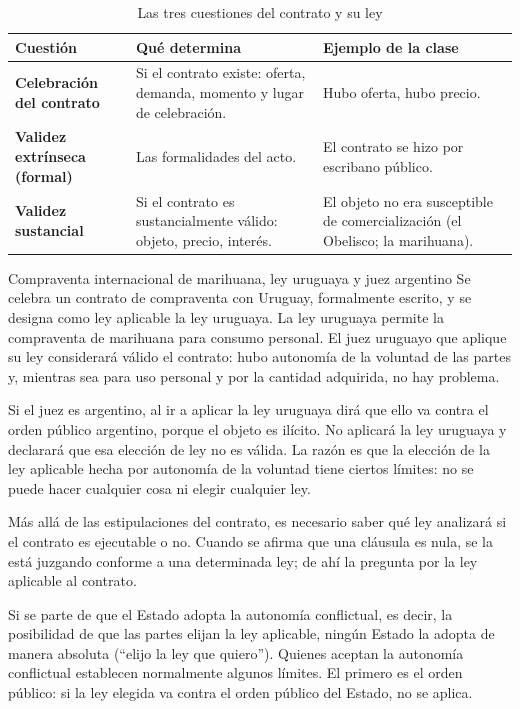 \documentclass[12pt,oneside]{book}
\begin{document}
\begin{table}[H]
\centering
\caption{Las tres cuestiones del contrato y su ley}
\small
\begin{tabularx}{\textwidth}{
    >{\raggedright\arraybackslash}p{}
    >{\raggedright\arraybackslash}X
    >{\raggedright\arraybackslash}X
}
\toprule
\textbf{Cuesti\'on} & \textbf{Qu\'e determina} & \textbf{Ejemplo de la clase} \\
\midrule
\textbf{Celebraci\'on del contrato} & Si el contrato existe: oferta, demanda, momento y lugar de celebraci\'on. & Hubo oferta, hubo precio. \\
\addlinespace
\textbf{Validez extr\'inseca (formal)} & Las formalidades del acto. & El contrato se hizo por escribano p\'ublico. \\
\addlinespace
\textbf{Validez sustancial} & Si el contrato es sustancialmente v\'alido: objeto, precio, inter\'es. & El objeto no era susceptible de comercializaci\'on (el Obelisco; la marihuana). \\
\bottomrule
\end{tabularx}
\end{table}

\begin{example}{Compraventa internacional de marihuana, ley uruguaya y juez argentino}
Se celebra un contrato de compraventa con Uruguay, formalmente escrito, y se designa como ley aplicable la ley uruguaya. La ley uruguaya permite la compraventa de marihuana para consumo personal. El juez uruguayo que aplique su ley considerar\'a v\'alido el contrato: hubo autonom\'ia de la voluntad de las partes y, mientras sea para uso personal y por la cantidad adquirida, no hay problema.

Si el juez es argentino, al ir a aplicar la ley uruguaya dir\'a que ello va contra el orden p\'ublico argentino, porque el objeto es il\'icito. No aplicar\'a la ley uruguaya y declarar\'a que esa elecci\'on de ley no es v\'alida. La raz\'on es que la elecci\'on de la ley aplicable hecha por autonom\'ia de la voluntad tiene ciertos l\'imites: no se puede hacer cualquier cosa ni elegir cualquier ley.
\end{example}

M\'as all\'a de las estipulaciones del contrato, es necesario saber qu\'e ley analizar\'a si el contrato es ejecutable o no. Cuando se afirma que una cl\'ausula es nula, se la est\'a juzgando conforme a una determinada ley; de ah\'i la pregunta por la ley aplicable al contrato.

Si se parte de que el Estado adopta la autonom\'ia conflictual, es decir, la posibilidad de que las partes elijan la ley aplicable, ning\'un Estado la adopta de manera absoluta (``elijo la ley que quiero''). Quienes aceptan la autonom\'ia conflictual establecen normalmente algunos l\'imites. El primero es el orden p\'ublico: si la ley elegida va contra el orden p\'ublico del Estado, no se aplica.
\end{document}
